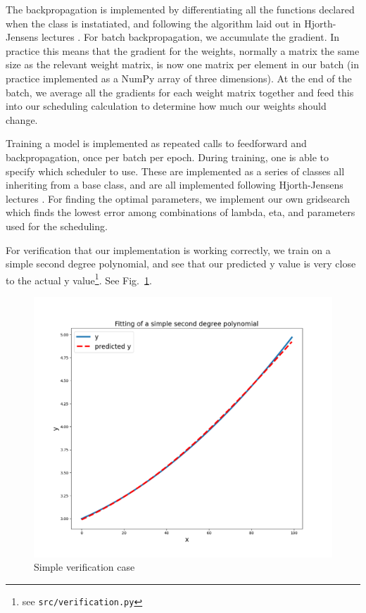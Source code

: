 \documentclass[onecolumn,10pt,cleanfoot]{asme2ej}
\begin{document}
The backpropagation is implemented by differentiating all the functions declared when the class is instatiated, and following the algorithm laid out in Hjorth-Jensens lectures \cite{morten}. For batch backpropagation, we accumulate the gradient. In practice this means that the gradient for the weights, normally a matrix the same size as the relevant weight matrix, is now one matrix per element in our batch (in practice implemented as a NumPy array of three dimensions). At the end of the batch, we average all the gradients for each weight matrix together and feed this into our scheduling calculation to determine how much our weights should change.

Training a model is implemented as repeated calls to feedforward and backpropagation, once per batch per epoch. During training, one is able to specify which scheduler to use. These are implemented as a series of classes all inheriting from a base class, and are all implemented following Hjorth-Jensens lectures \cite{mortensched}. For finding the optimal parameters, we implement our own gridsearch which finds the lowest error among combinations of lambda, eta, and parameters used for the scheduling.

For verification that our implementation is working correctly, we train on a simple second degree polynomial, and see that our predicted y value is very close to the actual y value\footnote{see \texttt{src/verification.py}}. See Fig.~\ref{verification}.

\begin{figure}[h]
\centerline{\includegraphics[width=5in]{figure/verification.png}}
\caption{Simple verification case}
\label{verification}
\end{figure}
\end{document}
